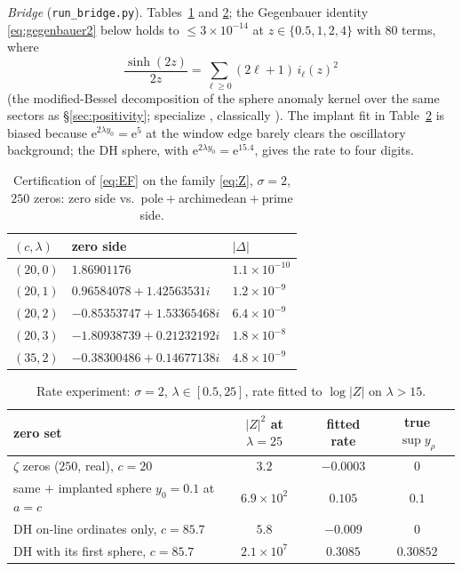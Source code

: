 \documentclass[11pt]{amsart}
\theoremstyle{plain}
\theoremstyle{definition}
\theoremstyle{remark}
\newcommand{\eE}{\mathrm{e}}
\begin{document}
\emph{Bridge} (\texttt{run\_bridge.py}). Tables~\ref{tab:EF} and \ref{tab:rate}; the Gegenbauer
identity \eqref{eq:gegenbauer2} below holds to $\le3\times10^{-14}$ at $z\in\{0.5,1,2,4\}$ with
$80$ terms, where
\begin{equation}\label{eq:gegenbauer2}
\frac{\sinh(2z)}{2z}=\sum_{\ell\ge0}(2\ell+1)\,i_\ell(z)^2
\end{equation}
(the modified-Bessel decomposition of the sphere anomaly kernel over the same sectors as
\S\ref{sec:positivity}; specialize \cite[10.60.2, 10.47.12]{DLMF}, classically
\cite[\S11.4]{Watson1944}). The implant fit in Table~\ref{tab:rate} is biased because
$\eE^{2\lambda y_0}=\eE^5$ at the window edge barely clears the oscillatory background; the DH
sphere, with $\eE^{2\lambda y_0}=\eE^{15.4}$, gives the rate to four digits.

\begin{table}[ht]
\centering
\caption{Certification of \eqref{eq:EF} on the family \eqref{eq:Z}, $\sigma=2$, $250$ zeros:
zero side vs.\ pole${}+{}$archimedean${}+{}$prime side.}\label{tab:EF}
\begin{tabular}{lll}
\toprule
$(c,\lambda)$ & zero side & $|\Delta|$ \\
\midrule
$(20,0)$ & $1.86901176$ & $1.1\times10^{-10}$\\
$(20,1)$ & $0.96584078+1.42563531i$ & $1.2\times10^{-9}$\\
$(20,2)$ & $-0.85353747+1.53365468i$ & $6.4\times10^{-9}$\\
$(20,3)$ & $-1.80938739+0.21232192i$ & $1.8\times10^{-8}$\\
$(35,2)$ & $-0.38300486+0.14677138i$ & $4.8\times10^{-9}$\\
\bottomrule
\end{tabular}
\end{table}

\begin{table}[ht]
\centering
\caption{Rate experiment: $\sigma=2$, $\lambda\in[0.5,25]$, rate fitted to $\log|Z|$ on
$\lambda>15$.}\label{tab:rate}
\begin{tabular}{lccc}
\toprule
zero set & $|Z|^2$ at $\lambda=25$ & fitted rate & true $\sup y_\rho$ \\
\midrule
$\zeta$ zeros ($250$, real), $c=20$ & $3.2$ & $-0.0003$ & $0$\\
same $+$ implanted sphere $y_0=0.1$ at $a=c$ & $6.9\times10^2$ & $0.105$ & $0.1$\\
DH on-line ordinates only, $c=85.7$ & $5.8$ & $-0.009$ & $0$\\
DH with its first sphere, $c=85.7$ & $2.1\times10^7$ & $\mathbf{0.3085}$ & $\mathbf{0.30852}$\\
\bottomrule
\end{tabular}
\end{table}
\end{document}
